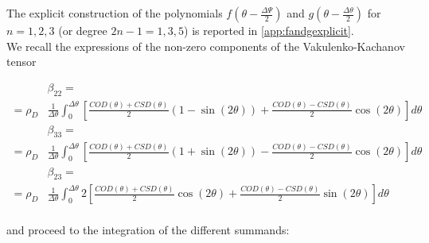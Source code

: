 \documentclass[review]{elsarticle}
\begin{document}
The explicit construction of the polynomials $f\left(\theta-\frac{\Delta\Psi}{2}\right)$ and $g\left(\theta-\frac{\Delta\theta}{2}\right)$ for $n=1,2,3$ (or degree $2n-1=1,3,5$) is reported in \ref{app:fandgexplicit}.\\We recall the expressions of the non-zero components of the Vakulenko-Kachanov tensor

\begin{equation}
\begin{aligned}
&\beta_{22}=\\
=\rho_{D}&\frac{1}{\Delta\theta}\int_{0}^{\Delta\theta}\left[\frac{COD\left(\theta\right)+CSD\left(\theta\right)}{2}\left(1-\sin\left(2\theta\right)\right)+\frac{COD\left(\theta\right)-CSD\left(\theta\right)}{2}\cos\left(2\theta\right)\right]d\theta\\
&\beta_{33}=\\
=\rho_{D}&\frac{1}{\Delta\theta}\int_{0}^{\Delta\theta}\left[\frac{COD\left(\theta\right)+CSD\left(\theta\right)}{2}\left(1+\sin\left(2\theta\right)\right)-\frac{COD\left(\theta\right)-CSD\left(\theta\right)}{2}\cos\left(2\theta\right)\right]d\theta\\
&\beta_{23}=\\
=\rho_{D}&\frac{1}{\Delta\theta}\int_{0}^{\Delta\theta}2\left[\frac{COD\left(\theta\right)+CSD\left(\theta\right)}{2}\cos\left(2\theta\right)+\frac{COD\left(\theta\right)-CSD\left(\theta\right)}{2}\sin\left(2\theta\right)\right]d\theta\\
\end{aligned}
\end{equation}

and proceed to the integration of the different summands:
\end{document}
